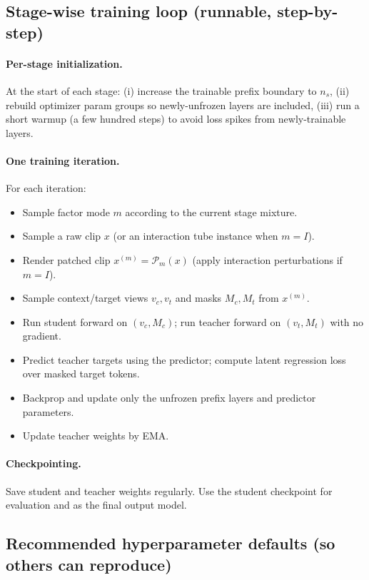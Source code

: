 \subsection{Stage-wise training loop (runnable, step-by-step)}\label{sec:surgery_loop}
\paragraph{Per-stage initialization.} At the start of each stage:
(i) increase the trainable prefix boundary to $n_s$,
(ii) rebuild optimizer param groups so newly-unfrozen layers are included,
(iii) run a short warmup (a few hundred steps) to avoid loss spikes from newly-trainable layers.
\paragraph{One training iteration.} For each iteration:
\begin{itemize}
  \item Sample factor mode $m$ according to the current stage mixture.
  \item Sample a raw clip $x$ (or an interaction tube instance when $m{=}I$).
  \item Render patched clip $x^{(m)}=\mathcal{P}_m(x)$ (apply interaction perturbations if $m{=}I$).
  \item Sample context/target views $v_c,v_t$ and masks $M_c,M_t$ from $x^{(m)}$.
  \item Run student forward on $(v_c,M_c)$; run teacher forward on $(v_t,M_t)$ with no gradient.
  \item Predict teacher targets using the predictor; compute latent regression loss over masked target tokens.
  \item Backprop and update only the unfrozen prefix layers and predictor parameters.
  \item Update teacher weights by EMA.
\end{itemize}
\paragraph{Checkpointing.} Save student and teacher weights regularly. Use the student checkpoint for evaluation and as the final output model.

\subsection{Recommended hyperparameter defaults (so others can reproduce)}\label{sec:surgery_defaults}
